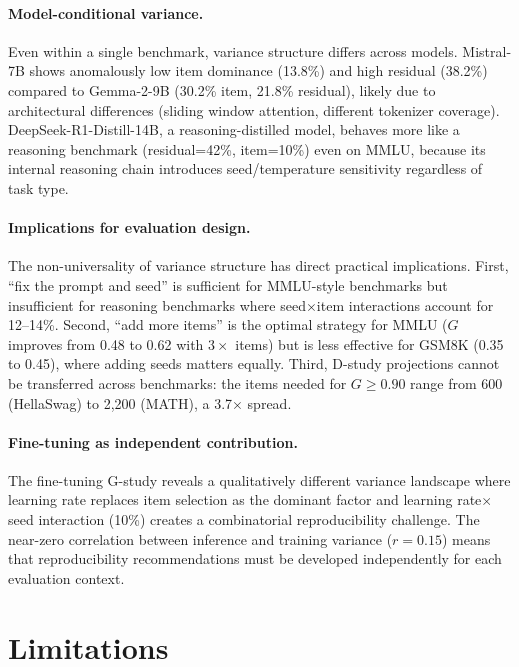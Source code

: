 \documentclass[letterpaper]{article}
\begin{document}
\paragraph{Model-conditional variance.}
Even within a single benchmark, variance structure differs across models.
Mistral-7B shows anomalously low item dominance (13.8\%) and high residual (38.2\%) compared to Gemma-2-9B (30.2\% item, 21.8\% residual), likely due to architectural differences (sliding window attention, different tokenizer coverage).
DeepSeek-R1-Distill-14B, a reasoning-distilled model, behaves more like a reasoning benchmark (residual=42\%, item=10\%) even on MMLU, because its internal reasoning chain introduces seed/temperature sensitivity regardless of task type.

\paragraph{Implications for evaluation design.}
The non-universality of variance structure has direct practical implications.
First, ``fix the prompt and seed'' is sufficient for MMLU-style benchmarks but insufficient for reasoning benchmarks where seed$\times$item interactions account for 12--14\%.
Second, ``add more items'' is the optimal strategy for MMLU ($G$ improves from 0.48 to 0.62 with $3\times$ items) but is less effective for GSM8K (0.35 to 0.45), where adding seeds matters equally.
Third, D-study projections cannot be transferred across benchmarks: the items needed for $G\geq 0.90$ range from 600 (HellaSwag) to 2{,}200 (MATH), a 3.7$\times$ spread.

\paragraph{Fine-tuning as independent contribution.}
The fine-tuning G-study reveals a qualitatively different variance landscape where learning rate replaces item selection as the dominant factor and learning rate$\times$seed interaction (10\%) creates a combinatorial reproducibility challenge.
The near-zero correlation between inference and training variance ($r=0.15$) means that reproducibility recommendations must be developed independently for each evaluation context.


\section{Limitations}
\end{document}
